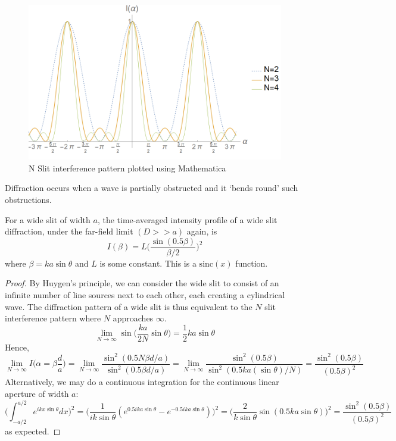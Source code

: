 \documentclass[a4paper]{article}
\begin{document}
\begin{figure}[H]
    \centering
    \includegraphics[scale=0.4]{Nslitinterference.PNG}
    \caption{N Slit interference pattern plotted using Mathematica}
    \label{Nslitinterference}
\end{figure}
\begin{defi}[Diffraction]
Diffraction occurs when a wave is partially obstructed and it `bends round' such obstructions.
\end{defi}
\begin{thm}
For a wide slit of width $a$, the time-averaged intensity profile of a wide slit diffraction, under the far-field limit $(D>>a)$ again, is
$$I(\beta)=L\bigg(\frac{\sin(0.5\beta)}{\beta/2}\bigg)^2$$
where $\beta=ka\sin\theta$ and $L$ is some constant. This is a $\text{sinc}(x)$ function.
\end{thm}
\begin{proof}
By Huygen's principle, we can consider the wide slit to consist of an infinite number of line sources next to each other, each creating a cylindrical wave. The diffraction pattern of a wide slit is thus equivalent to the $N$ slit interference pattern where $N$ approaches $\infty$.
$$\lim_{N\rightarrow\infty}\sin\bigg(\frac{ka}{2N}\sin\theta\bigg)=\frac{1}{2}ka\sin\theta$$
Hence, 
$$\lim_{N\rightarrow\infty}I\bigg(\alpha=\beta\frac{d}{a}\bigg)=\lim_{N\rightarrow\infty}\frac{\sin^2(0.5N\beta d/a)}{\sin^2(0.5\beta d/a)}=\lim_{N\rightarrow\infty}\frac{\sin^2(0.5\beta)}{\sin^2(0.5ka(\sin\theta)/N)}=\frac{\sin^2(0.5\beta)}{(0.5\beta)^2}$$
Alternatively, we may do a continuous integration for the continuous linear aperture of width $a$:
$$\bigg(\int_{-a/2}^{a/2}e^{ikx\sin\theta}dx\bigg)^2=\bigg(\frac{1}{ik\sin\theta}(e^{0.5ika\sin\theta}-e^{-0.5ika\sin\theta})\bigg)^2=\bigg(\frac{2}{k\sin\theta}\sin(0.5ka\sin\theta)\bigg)^2=\frac{\sin^2(0.5\beta)}{(0.5\beta)^2}$$
as expected.
\end{proof}
\end{document}

